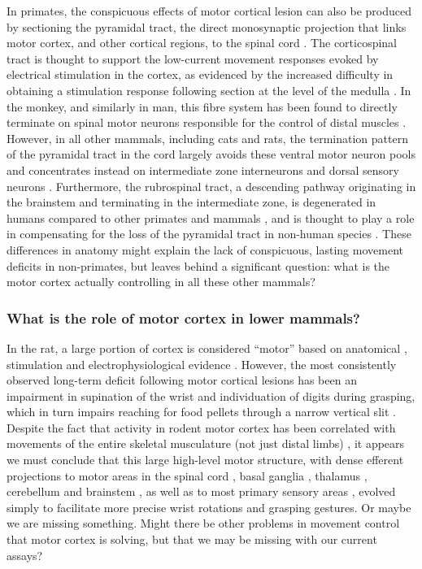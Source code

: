 In primates, the conspicuous effects of motor cortical lesion can also be produced by sectioning the pyramidal tract, the direct monosynaptic projection that links motor cortex, and other cortical regions, to the spinal cord \cite{Tower1940,Lawrence1968}. The corticospinal tract is thought to support the low-current movement responses evoked by electrical stimulation in the cortex, as evidenced by the increased difficulty in obtaining a stimulation response following section at the level of the medulla \cite{Woolsey1972}. In the monkey, and similarly in man, this fibre system has been found to directly terminate on spinal motor neurons responsible for the control of distal muscles \cite{Leyton1917,Bernhard1954}. However, in all other mammals, including cats and rats, the termination pattern of the pyramidal tract in the cord largely avoids these ventral motor neuron pools and concentrates instead on intermediate zone interneurons and dorsal sensory neurons \cite{Kuypers1981,Yang2003}. Furthermore, the rubrospinal tract, a descending pathway originating in the brainstem and terminating in the intermediate zone, is degenerated in humans compared to other primates and mammals \cite{Square1982}, and is thought to play a role in compensating for the loss of the pyramidal tract in non-human species \cite{Lawrence1968a,Zaaimi2012}. These differences in anatomy might explain the lack of conspicuous, lasting movement deficits in non-primates, but leaves behind a significant question: what is the motor cortex actually controlling in all these other mammals?

\subsubsection*{What is the role of motor cortex in lower mammals?}

In the rat, a large portion of cortex is considered ``motor'' based on anatomical \cite{Donoghue1982}, stimulation \cite{Donoghue1982,Neafsey1986} and electrophysiological evidence \cite{Hyland1998}. However, the most consistently observed long-term deficit following motor cortical lesions has been an impairment in supination of the wrist and individuation of digits during grasping, which in turn impairs reaching for food pellets through a narrow vertical slit \cite{Alaverdashvili2008a}. Despite the fact that activity in rodent motor cortex has been correlated with movements of the entire skeletal musculature (not just distal limbs) \cite{Hill2011,Erlich2011}, it appears we must conclude that this large high-level motor structure, with dense efferent projections to motor areas in the spinal cord \cite{Kuypers1981}, basal ganglia \cite{Turner2000,Wu2009}, thalamus \cite{Lee2008}, cerebellum \cite{Baker2001} and brainstem \cite{Jarratt1999}, as well as to most primary sensory areas \cite{Petreanu2012,Schneider2014}, evolved simply to facilitate more precise wrist rotations and grasping gestures. Or maybe we are missing something. Might there be other problems in movement control that motor cortex is solving, but that we may be missing with our current assays?

